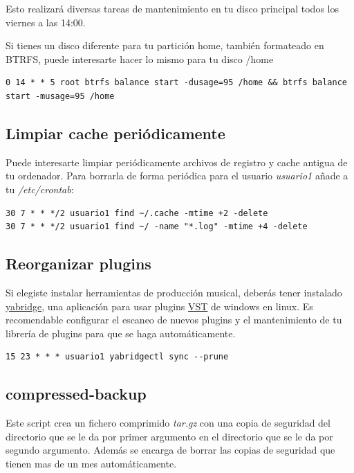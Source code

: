 \documentclass[12pt]{article}
\begin{document}
Esto realizará diversas tareas de mantenimiento en tu disco principal todos los viernes a las 14:00.

Si tienes un disco diferente para tu partición home, también formateado en BTRFS, puede interesarte hacer lo mismo para tu disco /home

\begin{lstlisting}[basicstyle=\scriptsize\ttfamily]
0 14 * * 5 root btrfs balance start -dusage=95 /home && btrfs balance start -musage=95 /home
\end{lstlisting}

\subsection{Limpiar cache periódicamente}

Puede interesarte limpiar periódicamente archivos de registro y cache antigua de tu ordenador. Para borrarla de forma periódica para el usuario \emph{usuario1} añade a tu \emph{/etc/crontab}:

\begin{verbatim}
30 7 * * */2 usuario1 find ~/.cache -mtime +2 -delete
30 7 * * */2 usuario1 find ~/ -name "*.log" -mtime +4 -delete
\end{verbatim}

\subsection{Reorganizar plugins}

Si elegiste instalar herramientas de producción musical, deberás tener instalado \href{https://github.com/robbert-vdh/yabridge}{yabridge}, una aplicación para usar plugins \href{https://es.wikipedia.org/wiki/Virtual_Studio_Technology}{VST} de windows en linux. Es recomendable configurar el escaneo de nuevos plugins y el mantenimiento de tu librería de plugins para que se haga automáticamente.

\begin{verbatim}
15 23 * * * usuario1 yabridgectl sync --prune
\end{verbatim}

\subsection{compressed-backup}

Este script crea un fichero comprimido \emph{tar.gz} con una copia de seguridad del directorio que se le da por primer argumento en el directorio que se le da por segundo argumento. Además se encarga de borrar las copias de seguridad que tienen mas de un mes automáticamente.
\end{document}
